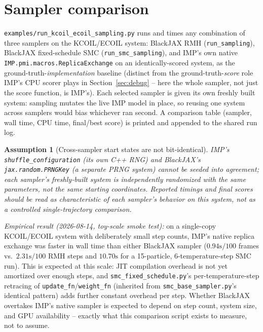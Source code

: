 \documentclass[11pt]{article}
\newtheorem{assumption}{Assumption}
\begin{document}
\section{Sampler comparison}
\label{sec:comparison}

\texttt{examples/run\_kcoil\_ecoil\_sampling.py} runs and times any
combination of three samplers on the KCOIL/ECOIL system: BlackJAX RMH
(\texttt{run\_sampling}), BlackJAX fixed-schedule SMC
(\texttt{run\_smc\_sampling}), and IMP's own native
\texttt{IMP.pmi.macros.ReplicaExchange} on an identically-scored system, as
the ground-truth-\emph{implementation} baseline (distinct from the
ground-truth-\emph{score} role IMP's CPU scorer plays in
Section~\ref{sec:debug} -- here the whole sampler, not just the score
function, is IMP's). Each selected sampler is given its own freshly built
system: sampling mutates the live IMP model in place, so reusing one system
across samplers would bias whichever ran second. A comparison table
(sampler, wall time, CPU time, final/best score) is printed and appended to
the shared run log.

\begin{assumption}[Cross-sampler start states are not bit-identical]
IMP's \texttt{shuffle\_configuration} (its own C++ RNG) and BlackJAX's
\texttt{jax.random.PRNGKey} (a separate PRNG system) cannot be seeded into
agreement; each sampler's freshly-built system is independently randomized
with the same \emph{parameters}, not the same starting coordinates.
Reported timings and final scores should be read as characteristic of each
sampler's behavior on this system, not as a controlled single-trajectory
comparison.
\end{assumption}

\emph{Empirical result (2026-08-14, toy-scale smoke test):} on a
single-copy KCOIL/ECOIL system with deliberately small step counts, IMP's
native replica exchange was faster in wall time than either BlackJAX
sampler ($0.94\mathrm{s}/100$ frames vs.\ $2.31\mathrm{s}/100$ RMH steps and
$10.70\mathrm{s}$ for a 15-particle, 6-temperature-step SMC run). This is
expected at this scale: JIT compilation overhead is not yet amortized over
enough steps, and \texttt{smc\_fixed\_schedule.py}'s per-temperature-step
retracing of \texttt{update\_fn}/\texttt{weight\_fn} (inherited from
\texttt{smc\_base\_sampler.py}'s identical pattern) adds further constant
overhead per step. Whether BlackJAX overtakes IMP's native sampler is
expected to depend on step count, system size, and GPU availability --
exactly what this comparison script exists to measure, not to assume.
\end{document}
